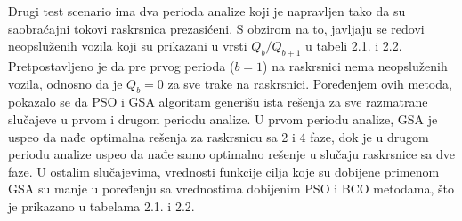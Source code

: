 Drugi test scenario ima dva perioda analize koji je napravljen tako da su saobraćajni tokovi raskrsnica prezasićeni. S obzirom na to, javljaju se redovi neopsluženih vozila koji su prikazani u vrsti $Q_b / Q_{b+1}$ u tabeli 2.1. i 2.2. Pretpostavljeno je da pre prvog perioda ($b=1$) na raskrsnici nema neopsluženih vozila, odnosno da je $Q_b = 0$ za sve trake na raskrsnici. Poređenjem ovih metoda, pokazalo se da PSO i GSA algoritam generišu ista rešenja za sve razmatrane slučajeve u prvom i drugom periodu analize. U prvom periodu analize, GSA je uspeo da nađe optimalna rešenja za raskrsnicu sa 2 i 4 faze, dok je u drugom periodu analize uspeo da nađe samo optimalno rešenje u slučaju raskrsnice sa dve faze. U ostalim slučajevima, vrednosti funkcije cilja koje su dobijene primenom GSA su manje u poređenju sa vrednostima dobijenim PSO i BCO metodama, što je prikazano u tabelama 2.1. i 2.2. 



